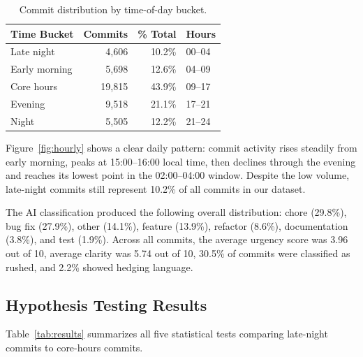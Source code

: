 \documentclass[sigconf]{acmart}
\begin{document}
\begin{table}[h]
  \caption{Commit distribution by time-of-day bucket.}
  \label{tab:distribution}
  \begin{tabular}{lrrl}
    \toprule
    Time Bucket    & Commits & \% Total & Hours \\
    \midrule
    Late night     & 4,606   & 10.2\%   & 00--04 \\
    Early morning  & 5,698   & 12.6\%   & 04--09 \\
    Core hours     & 19,815  & 43.9\%   & 09--17 \\
    Evening        & 9,518   & 21.1\%   & 17--21 \\
    Night          & 5,505   & 12.2\%   & 21--24 \\
    \bottomrule
  \end{tabular}
\end{table}

Figure~\ref{fig:hourly} shows a clear daily pattern: commit activity rises steadily from early morning, peaks at 15:00--16:00 local time, then declines through the evening and reaches its lowest point in the 02:00--04:00 window. Despite the low volume, late-night commits still represent 10.2\% of all commits in our dataset.

The AI classification produced the following overall distribution: chore (29.8\%), bug fix (27.9\%), other (14.1\%), feature (13.9\%), refactor (8.6\%), documentation (3.8\%), and test (1.9\%). Across all commits, the average urgency score was 3.96 out of 10, average clarity was 5.74 out of 10, 30.5\% of commits were classified as rushed, and 2.2\% showed hedging language.


\subsection{Hypothesis Testing Results}

Table~\ref{tab:results} summarizes all five statistical tests comparing late-night commits to core-hours commits.
\end{document}
